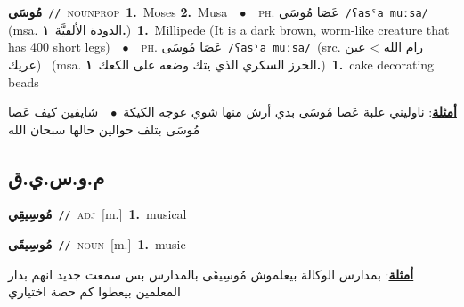 \documentclass[10pt,a4paper,twoside]{article} %
\begin{document}
\begin{multicols}{2}
{\setlength\topsep{0pt}\textbf{\foreignlanguage{arabic}{مُوسَى}}\ {\color{gray}\texttt{//}\color{black}}\ \textsc{noun\textunderscore prop}\ \textbf{1.}~Moses  \textbf{2.}~Musa\ \ $\bullet$\ \ \textsc{ph.} \color{gray} \foreignlanguage{arabic}{عَصَا مُوسَى}\color{black}\ {\color{gray}\texttt{/{\sffamily ʕasˤa muːsa}/}\color{black}}\ \color{gray} (msa. \foreignlanguage{arabic}{الدودة الألفيَّة}~\foreignlanguage{arabic}{\textbf{١.}})\color{black}\ \textbf{1.}~Millipede (It is a dark brown, worm-like creature that has 400 short legs)\ \ $\bullet$\ \ \textsc{ph.} \color{gray} \foreignlanguage{arabic}{عَصَا مُوسَى}\color{black}\ {\color{gray}\texttt{/{\sffamily ʕasˤa muːsa}/}\color{black}}\ \color{gray}(src. \foreignlanguage{arabic}{رام الله > عين عريك})\color{black}\ \color{gray} (msa. \foreignlanguage{arabic}{الخرز السكري الذي يتك وضعه على الكعك}~\foreignlanguage{arabic}{\textbf{١.}})\color{black}\ \textbf{1.}~cake decorating beads\  \begin{flushright}\color{gray}\foreignlanguage{arabic}{\textbf{\underline{\foreignlanguage{arabic}{أمثلة}}}: ناوليني علبة عَصا مُوسَى بدي أرش منها شوي عوجه الكيكة\ $\bullet$\ \  شايفين كيف عَصا مُوسَى بتلف حوالين حالها سبحان الله}\end{flushright}\color{black}} \vspace{2mm}

\vspace{-3mm}
\subsection*{\color{blue}\foreignlanguage{arabic}{م.و.س.ي.ق}\color{blue}{ (ntws)}} 

{\setlength\topsep{0pt}\textbf{\foreignlanguage{arabic}{مُوسِيقِي}}\ {\color{gray}\texttt{//}\color{black}}\ \textsc{adj}\ [m.]\ \textbf{1.}~musical\ } \vspace{2mm}

{\setlength\topsep{0pt}\textbf{\foreignlanguage{arabic}{مُوسِيقَى}}\ {\color{gray}\texttt{//}\color{black}}\ \textsc{noun}\ [m.]\ \textbf{1.}~music\  \begin{flushright}\color{gray}\foreignlanguage{arabic}{\textbf{\underline{\foreignlanguage{arabic}{أمثلة}}}: بمدارس الوكالة بيعلموش مُوسِيقَى بالمدارس بس سمعت جديد انهم بدار المعلمين بيعطوا كم حصة اختياري}\end{flushright}\color{black}} \vspace{2mm}


\end{multicols}
\end{document}

